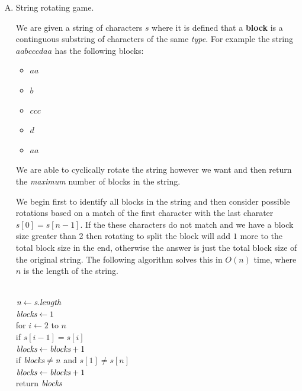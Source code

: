 \documentclass[11pt]{article}
\begin{document}
\begin{enumerate}[(A)]
    \item 
    \begin{center}
        String rotating game.        
    \end{center}
    We are given a string of characters $s$ where it is defined that a \textbf{block} is a continguous substring of characters of the same \emph{type}.
    For example the string $aabcccdaa$ has the following blocks:
    \begin{itemize}
        \item $aa$ 
        \item $b$
        \item $ccc$
        \item $d$
        \item $aa$
    \end{itemize}
    We are able to cyclically rotate the string however we want and then return the \emph{maximum} number of blocks in the string.

    \begin{Solution}
        We begin first to identify all blocks in the string and then consider possible rotations based on a match of the first character with the
        last charater $s[0] = s[n-1]$. If the these characters do not match and we have a block size greater than 2 then rotating to split the block will add $1$ more
        to the total block size in the end, otherwise the answer is just the total block size of the original string. The following algorithm solves this in $O(n)$ time, where
        $n$ is the length of the string.

        \begin{algo}
            \+
        \\  $\emph{n} \gets \emph{s}.\emph{length}$
        \\  $\emph{blocks} \gets 1$
        \\ for $i\gets 2$ to $n$\+
        \\      if $s[i-1] = s[i]$\+
        \\          $\emph{blocks} \gets \emph{blocks} + 1$\-\- 
        \\  if $\emph{blocks} \neq \emph{n}$ and $s[1] \neq s[n]$\+
        \\      $\emph{blocks} \gets \emph{blocks} + 1$\- 
        \\ return $\emph{blocks}$
        \end{algo}

    \end{Solution}
\end{enumerate}
\end{document}
